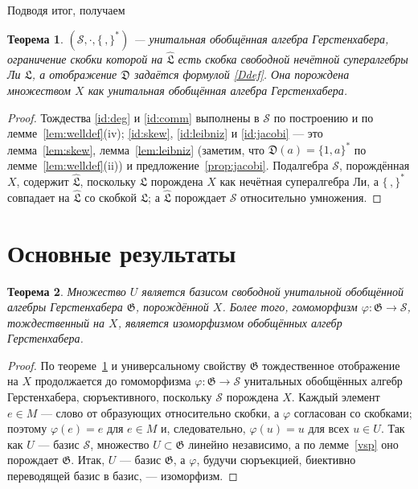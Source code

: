 \documentclass[11pt,reqno]{amsart}
\newcommand{\G}{\mathfrak G}
\newcommand{\LL}{\mathfrak L}
\newcommand{\D}{\mathfrak D}
\newcommand{\Sm}{\mathcal S}
\newcommand{\Lh}{\widehat{\LL}}
\theoremstyle{plain}
\newtheorem{theorem}{Теорема}
\theoremstyle{definition}
\theoremstyle{remark}
\begin{document}
Подводя итог, получаем

\begin{theorem}\label{thm:model}
$(\Sm,\cdot,\{\,,\}^*)$ --- унитальная обобщённая алгебра Герстенхабера, ограничение скобки которой на $\Lh$ есть скобка свободной нечётной супералгебры Ли $\LL$, а отображение $\D$ задаётся формулой \eqref{Ddef}.
Она порождена множеством $X$ как унитальная обобщённая алгебра Герстенхабера.
\end{theorem}

\begin{proof}
Тождества \eqref{id:deg} и \eqref{id:comm} выполнены в $\Sm$ по построению и по лемме~\ref{lem:welldef}(iv); \eqref{id:skew}, \eqref{id:leibniz} и \eqref{id:jacobi} --- это лемма~\ref{lem:skew}, лемма~\ref{lem:leibniz} (заметим, что $\D(a)=\{1,a\}^*$ по лемме~\ref{lem:welldef}(ii)) и предложение~\ref{prop:jacobi}.
Подалгебра $\Sm$, порождённая $X$, содержит $\Lh$, поскольку $\LL$ порождена $X$ как нечётная супералгебра Ли, а $\{\,,\}^*$ совпадает на $\Lh$ со скобкой $\LL$; а $\Lh$ порождает $\Sm$ относительно умножения.
\end{proof}

\section{Основные результаты}

\begin{theorem}\label{basis}
Множество $U$ является базисом свободной унитальной обобщённой алгебры Герстенхабера $\G$, порождённой $X$.
Более того, гомоморфизм $\varphi\colon\G\to\Sm$, тождественный на $X$, является изоморфизмом обобщённых алгебр Герстенхабера.
\end{theorem}

\begin{proof}
По теореме~\ref{thm:model} и универсальному свойству $\G$ тождественное отображение на $X$ продолжается до гомоморфизма $\varphi\colon\G\to\Sm$ унитальных обобщённых алгебр Герстенхабера, сюръективного, поскольку $\Sm$ порождена $X$.
Каждый элемент $e\in M$ --- слово от образующих относительно скобки, а $\varphi$ согласован со скобками; поэтому $\varphi(e)=e$ для $e\in M$ и, следовательно, $\varphi(u)=u$ для всех $u\in U$.
Так как $U$ --- базис $\Sm$, множество $U\subset\G$ линейно независимо, а по лемме~\ref{vsp} оно порождает $\G$.
Итак, $U$ --- базис $\G$, а $\varphi$, будучи сюръекцией, биективно переводящей базис в базис, --- изоморфизм.
\end{proof}
\end{document}

